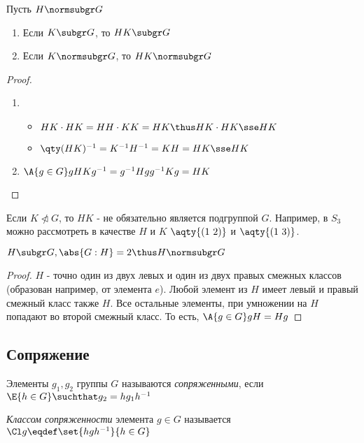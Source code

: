 \begin{theorem}
  Пусть $H\normsubgr G$
  \begin{enumerate}
    \item Если $K \subgr G$, то $HK \subgr G$
    \item Если $K \normsubgr G$, то $HK \normsubgr G$
  \end{enumerate}
\end{theorem}
\begin{proof}
  \theoremlistshack
  \begin{enumerate}
    \item \begin{itemize}
            \item $HK\cdot HK=HH\cdot KK=HK\thus HK\cdot HK \sse HK$
            \item $\qty(HK)^{-1}=K^{-1} H^{-1}=KH=HK\sse HK$
          \end{itemize}
    \item $\A{g\in G} gHKg^{-1}=g^{-1} Hgg^{-1} Kg=HK$
  \end{enumerate}
\end{proof}
\begin{remark}
  Если $K\ntriangleleft G$, то $HK$ - не обязательно является подгруппой $G$. Например, в $S_3$ можно рассмотреть в качестве $H$ и $K$ $\aqty{(1\ 2)}$ и $\aqty{(1\ 3)}$.
\end{remark}
\begin{theorem}
  $H\subgr G, \abs{G:H}=2 \thus H\normsubgr G$
\end{theorem}
\begin{proof}
  $H$ - точно один из двух левых и один из двух правых смежных классов (образован например, от элемента $e$). Любой элемент из $H$ имеет левый и правый смежный класс также $H$. Все остальные элементы, при умножении на $H$ попадают во второй смежный класс. То есть, $\A{g\in G} gH=Hg$
\end{proof}

\subsection{Сопряжение}
\begin{definition}
  Элементы $g_1, g_2$ группы $G$ называются \emph{сопряженными}, если $\E{h\in G}\suchthat g_2=hg_1h^{-1}$
\end{definition}

\begin{definition}
  \sloppy \emph{Классом сопряженности} элемента $g\in G$ называется $\Cl g\eqdef \set{hgh^{-1}}{h\in G}$
\end{definition}

